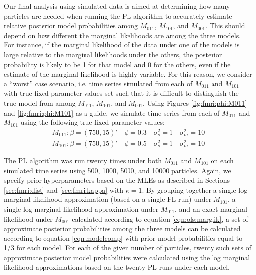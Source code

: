 Our final analysis using simulated data is aimed at determining how many particles are needed when running the PL algorithm to accurately estimate relative posterior model probabilities among $M_{011}$, $M_{101}$, and $M_{001}$. This should depend on how different the marginal likelihoods are among the three models. For instance, if the marginal likelihood of the data under one of the models is large relative to the marginal likelihoods under the others, the posterior probability is likely to be 1 for that model and 0 for the others,  even if the estimate of the marginal likelihood is highly variable. For this reason, we consider a ``worst'' case scenario, i.e. time series simulated from each of $M_{011}$ and $M_{101}$ with true fixed parameter values set such that it is difficult to distinguish the true model from among $M_{011}$, $M_{101}$, and $M_{001}$. Using Figures \ref{fig:fmri:phi:M011} and \ref{fig:fmri:phi:M101} as a guide, we simulate time series from each of $M_{011}$ and $M_{101}$ using the following true fixed parameter values:
\begin{align}
M_{011}: \beta = (750,15)' \quad \phi = 0.3 \quad \sigma^2_s = 1 \quad \sigma^2_m = 10 \label{eqn:fmri:sim:M011} \\
M_{101}: \beta = (750,15)' \quad \phi = 0.5 \quad \sigma^2_s = 1 \quad \sigma^2_m = 10 \label{eqn:fmri:sim:M101}
\end{align}

The PL algorithm was run twenty times under both $M_{011}$ and $M_{101}$ on each simulated time series using 500, 1000, 5000, and 10000 particles. Again, we specify prior hyperparameters based on the MLEs as described in Sections \ref{sec:fmri:dist} and \ref{sec:fmri:kappa} with $\kappa = 1$. By grouping together a single log marginal likelihood approximation (based on a single PL run) under $M_{101}$, a single log marginal likelihood approximation under $M_{011}$, and an exact marginal likelihood under $M_{001}$ calculated according to equation \eqref{eqn:ols:marglik}, a set of approximate posterior probabilities among the three models can be calculated according to equation \eqref{eqn:modelcomp} with prior model probabilities equal to 1/3 for each model. For each of the given number of particles, twenty such sets of approximate posterior model probabilities were calculated using the log marginal likelihood approximations based on the twenty PL runs under each model.

